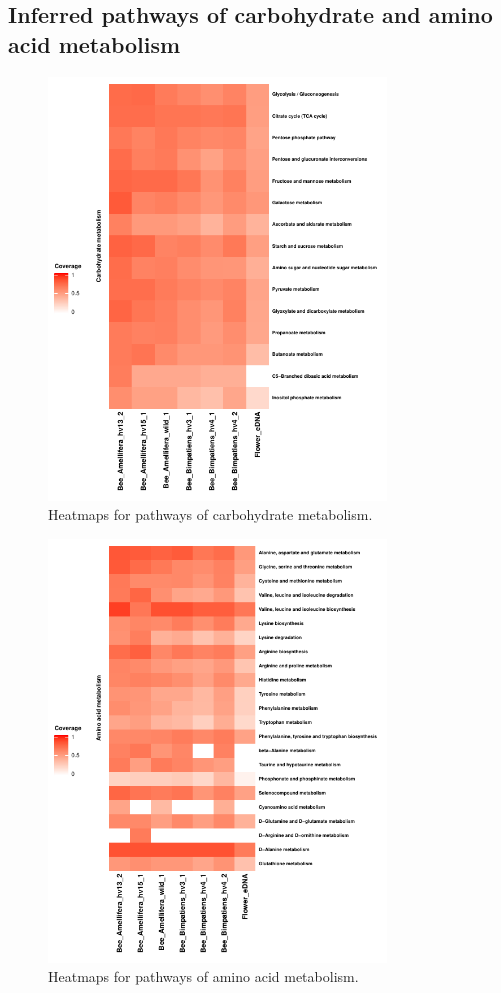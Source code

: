 \documentclass[11pt]{article}
\begin{document}
  \subsection{Inferred pathways of carbohydrate and amino acid metabolism}
  \begin{figure}[H]
    \centering
    \includegraphics[width=0.8\textwidth]{../Figures/PathwayCov_Carbonhydrate.pdf}
    \caption{Heatmaps for pathways of carbohydrate metabolism.}
    \label{Carbohydrate}
    \end{figure}

    \begin{figure}[H]
      \centering
      \includegraphics[width=0.8\textwidth]{../Figures/PathwayCov_AminoAcid.pdf}
      \caption{Heatmaps for pathways of amino acid metabolism.}
      \label{AminoAcid}
      \end{figure}
\end{document}
